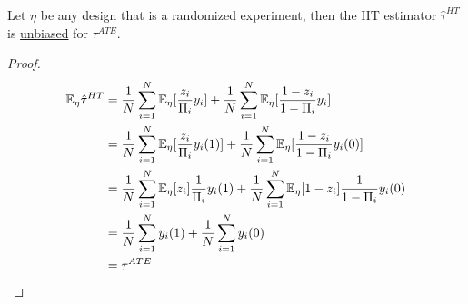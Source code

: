 \documentclass[11pt]{article}
\newcommand{\tauhat}[0]{\hat{\tau}}
\begin{document}
	\begin{proposition}
		Let $\eta$ be any design that is a randomized experiment, then the HT estimator $\tauhat^{HT}$ is \ul{unbiased} for $\tau^{ATE}$.
		\begin{proof}
			\begin{align}
				\expe_\eta \tauhat^{HT} &= \frac{1}{N} \sum_{i=1}^N \expe_\eta [\frac{z_i}{\Pi_i}y_i] + \frac{1}{N} \sum_{i=1}^N \expe_\eta[\frac{1-z_i}{1-\Pi_i}y_i] \\
				&= \frac{1}{N} \sum_{i=1}^N \expe_\eta [\frac{z_i}{\Pi_i}y_i(1)] + \frac{1}{N} \sum_{i=1}^N \expe_\eta[\frac{1-z_i}{1-\Pi_i}y_i(0)] \\
				&= \frac{1}{N} \sum_{i=1}^N \expe_\eta[z_i] \frac{1}{\Pi_i}y_i(1) + \frac{1}{N} \sum_{i=1}^N \expe_\eta[1-z_i] \frac{1}{1-\Pi_i}y_i(0) \\
				&= \frac{1}{N} \sum_{i=1}^N y_i(1) + \frac{1}{N} \sum_{i=1}^N y_i(0) \\
				&= \tau^{ATE}
			\end{align}
		\end{proof}
	\end{proposition}
\end{document}
